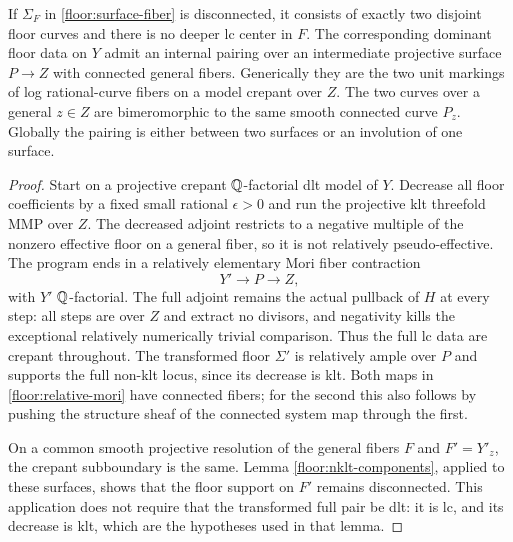 \begin{lemma}
\label{floor:disconnected-fiber}
If $\Sigma_F$ in \eqref{floor:surface-fiber} is
disconnected, it consists of exactly two disjoint
floor curves and there is no deeper lc center in
$F$.  The corresponding dominant floor data on
$Y$ admit an internal pairing over an intermediate
projective surface $P\to Z$ with connected general
fibers.  Generically they are the two unit markings
of log rational-curve fibers on a model crepant
over $Z$.  The two curves over a general $z\in Z$
are bimeromorphic to the same smooth connected
curve $P_z$.  Globally the pairing is either
between two surfaces or an involution of one
surface.
\end{lemma}

\begin{proof}
Start on a projective crepant $\mathbb{Q}$-factorial dlt
model of $Y$.  Decrease all floor coefficients
by a fixed small rational $\epsilon>0$ and run
the projective klt threefold MMP over $Z$.
The decreased adjoint restricts to a negative
multiple of the nonzero effective floor on
a general fiber, so it is not relatively
pseudo-effective.  The program ends in a
relatively elementary Mori fiber contraction
\begin{equation}
 \label{floor:relative-mori}
 Y'\longrightarrow P\longrightarrow Z,
\end{equation}
with $Y'$ $\mathbb{Q}$-factorial.  The full adjoint
remains the actual pullback of $H$ at every
step: all steps are over $Z$ and extract no
divisors, and negativity kills the exceptional
relatively numerically trivial comparison.
Thus the full lc data are crepant throughout.
The transformed floor $\Sigma'$ is relatively
ample over $P$ and supports the full non-klt
locus, since its decrease is klt.  Both maps
in \eqref{floor:relative-mori} have connected
fibers; for the second this also follows by
pushing the structure sheaf of the connected
system map through the first.

On a common smooth projective resolution of
the general fibers $F$ and $F'=Y'_z$, the
crepant subboundary is the same.  Lemma
\ref{floor:nklt-components}, applied to these
surfaces, shows that the floor support on
$F'$ remains disconnected.  This application
does not require that the transformed full
pair be dlt: it is lc, and its decrease is
klt, which are the hypotheses used in that
lemma.


\end{proof}
